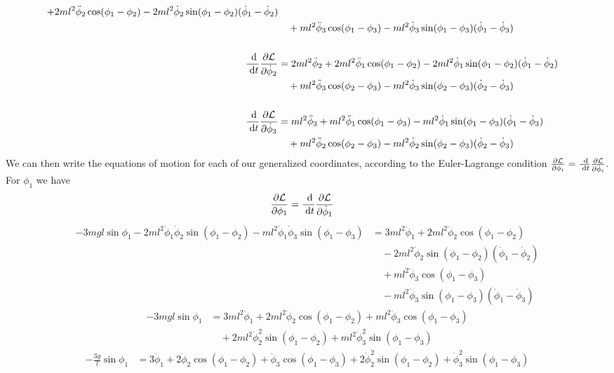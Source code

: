 \documentclass{article}
\renewcommand{\L}{\mathcal{L}}
\begin{document}
\begin{appendices}
\begin{align}
            + 2ml^2\ddot\phi_2\cos(\phi_1-\phi_2) 
            - 2ml^2\dot\phi_2\sin(\phi_1-\phi_2)(\dot\phi_1-\dot\phi_2) \\
            &\quad + ml^2\ddot\phi_3\cos(\phi_1-\phi_3) 
            - ml^2\dot\phi_3\sin(\phi_1-\phi_3)(\dot\phi_1-\dot\phi_3) \\\\
        \D{}{t}\pD{\L}{\dot\phi_2} &= 2ml^2\ddot\phi_2 
            + 2ml^2\ddot\phi_1\cos(\phi_1-\phi_2) 
            - 2ml^2\dot\phi_1\sin(\phi_1-\phi_2)(\dot\phi_1-\dot\phi_2) \\
            &\quad + ml^2\ddot\phi_3\cos(\phi_2-\phi_3) 
            - ml^2\dot\phi_3\sin(\phi_2-\phi_3)(\dot\phi_2-\dot\phi_3) \\\\
        \D{}{t}\pD{\L}{\dot\phi_3} &= ml^2\ddot\phi_3 
            + ml^2\ddot\phi_1\cos(\phi_1-\phi_3) 
            - ml^2\dot\phi_1\sin(\phi_1-\phi_3)(\dot\phi_1-\dot\phi_3) \\
            &\quad + ml^2\ddot\phi_2\cos(\phi_2-\phi_3) 
            - ml^2\dot\phi_2\sin(\phi_2-\phi_3)(\dot\phi_2-\dot\phi_3) 
    \end{align}
    We can then write the equations of motion for each of our generalized
    coordinates, according to the Euler-Lagrange condition $\pD{\L}{\phi_i}
    =\D{}{t}\pD{\L}{\dot\phi_i}$. For $\phi_1$ we have
    \begin{align}
        \pD{\L}{\phi_1} &= \D{}{t}\pD{\L}{\dot\phi_1} 
    \end{align}
    \begin{align}
        -3mgl\sin\phi_1 -2ml^2\dot\phi_1\dot\phi_2\sin(\phi_1-\phi_2)
            -ml^2\dot\phi_1\dot\phi_3\sin(\phi_1-\phi_3)
        &= 3ml^2\ddot\phi_1 + 2ml^2\ddot\phi_2\cos(\phi_1-\phi_2) \\
        &\quad - 2ml^2\dot\phi_2\sin(\phi_1-\phi_2)(\dot\phi_1-\dot\phi_2) \\
        &\quad + ml^2\ddot\phi_3\cos(\phi_1-\phi_3) \\
        &\quad - ml^2\dot\phi_3\sin(\phi_1-\phi_3)(\dot\phi_1-\dot\phi_3) 
    \end{align}
    \begin{align}
        -3mgl\sin\phi_1 &= 3ml^2\ddot\phi_1 + 2ml^2\ddot\phi_2\cos(\phi_1-\phi_2)
            + ml^2\ddot\phi_3\cos(\phi_1-\phi_3)  \\
            &\quad + 2ml^2\dot\phi_2^2\sin(\phi_1-\phi_2)
            + ml^2\dot\phi_3^2\sin(\phi_1-\phi_3)
    \end{align}
    \begin{align}
        -\frac{3g}{l}\sin\phi_1 &= 3\ddot\phi_1 + 2\ddot\phi_2\cos(\phi_1-\phi_2)
            + \ddot\phi_3\cos(\phi_1-\phi_3) + 2\dot\phi_2^2\sin(\phi_1-\phi_2)
            + \dot\phi_3^2\sin(\phi_1-\phi_3)   \label{eq_m1}
    \end{align}


\end{appendices}
\end{document}
